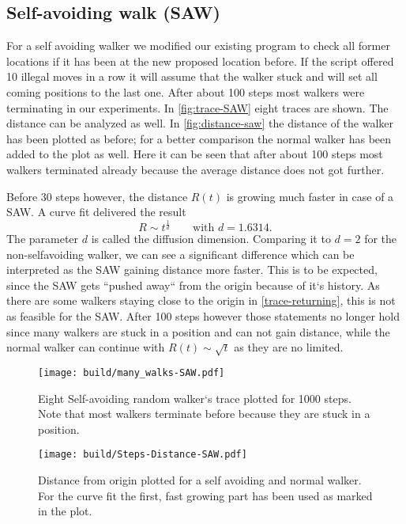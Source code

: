 \documentclass{article}
\begin{document}
\subsection{Self-avoiding walk (SAW)}
\label{sec:Normal Walker}
For a self avoiding walker we modified our existing program to check all former locations if it has been at the new proposed location before. If the script offered 10 illegal moves in a row it will assume that the walker stuck and
will set all coming positions to the last one. After about 100 steps most walkers were terminating in our
experiments. In \autoref{fig:trace-SAW} eight traces are shown. The distance can be analyzed as well. In 
\autoref{fig:distance-saw} the distance of the walker has been plotted as before; for a better comparison the 
normal walker has been added to the plot as well. Here it can be seen that after about 100 steps most walkers 
terminated already because the average distance does not got further.

Before 30 steps however, the distance $R(t)$ is growing much faster in case of a SAW. A curve fit delivered the
result 
\[
  R \sim t^\frac{1}{d} \qquad \text{with } d = 1.6314.
\]
The parameter $d$ is called the diffusion dimension. Comparing it to $d = 2$ for the non-selfavoiding walker, 
we can see a significant difference which can be interpreted as the SAW gaining distance more faster. This is 
to be expected, since the SAW gets ``pushed away`` from the origin because of it`s history. As there are 
some walkers staying close to the origin in \autoref{trace-returning}, this is not as feasible for the SAW.
After 100 steps however those statements no longer hold since many walkers are stuck in a position and 
can not gain distance, while the normal walker can continue with $R(t) \sim \sqrt{t}$ as they are no 
limited.
\begin{figure}
	\centering
	\texttt{[image: build/many\_walks-SAW.pdf]}
	\caption{Eight Self-avoiding random walker`s trace plotted for 1000 steps. Note that most walkers terminate 
           before because they are stuck in a position.}
  \label{fig:trace-SAW}
\end{figure}
\begin{figure}
	\centering
	\texttt{[image: build/Steps-Distance-SAW.pdf]}
  \caption{Distance from origin plotted for a self avoiding and normal walker. For the curve fit the first, fast 
            growing part has been used as marked in the plot.}
  \label{fig:distance-saw}
\end{figure}
\end{document}

